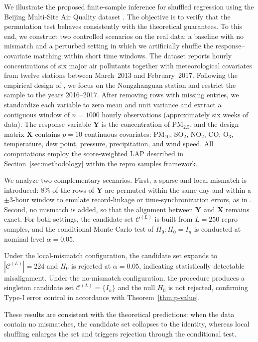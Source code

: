 \documentclass[11pt, reqno]{amsart}
\newcommand{\mC}{\mathcal{C}}
\newcommand{\1}{\mbox{1}\hspace{-0.25em}\mbox{l}}
\theoremstyle{definition}\newtheorem{problem}{Problem}[section]
\theoremstyle{definition}\newtheorem{definition}[problem]{Definition}
\theoremstyle{remark}\newtheorem{assumption}{Assumption}
\theoremstyle{remark}\newtheorem{remark}[problem]{Remark}
\theoremstyle{definition}\newtheorem{example}[problem]{Example}
\theoremstyle{plain}\newtheorem{theorem}[problem]{Theorem}
\theoremstyle{plain}\newtheorem{question}[problem]{Question}
\theoremstyle{plain}\newtheorem{lemma}[problem]{Lemma}
\theoremstyle{plain}\newtheorem{proposition}[problem]{Proposition}
\theoremstyle{plain}\newtheorem{corollary}[problem]{Corollary}
\theoremstyle{plain}\newtheorem{conjecture}[problem]{Conjecture}
\begin{document}
We illustrate the proposed finite-sample inference for shuffled regression using the Beijing Multi-Site Air Quality dataset \citep{beijing_multi-site_air_quality_501}. The objective is to verify that the permutation test behaves consistently with the theoretical guarantees. To this end, we construct two controlled scenarios on the real data: a baseline with no mismatch and a perturbed setting in which we artificially shuffle the response–covariate matching within short time windows. The dataset reports hourly concentrations of six major air pollutants together with meteorological covariates from twelve stations between March~2013 and February~2017.  
Following the empirical design of \cite{slawski2020two}, we focus on the Nongzhanguan station and restrict the sample to the years 2016–2017.  
After removing rows with missing entries, we standardize each variable to zero mean and unit variance and extract a contiguous window of $n=1000$ hourly observations (approximately six weeks of data).  
The response variable $\bm{Y}$ is the concentration of PM$_{2.5}$, and the design matrix $\bm X$ contains $p=10$ continuous covariates: PM$_{10}$, SO$_2$, NO$_2$, CO, O$_3$, temperature, dew point, pressure, precipitation, and wind speed.  
All computations employ the score-weighted LAP described in Section~\ref{sec:methodology} within the repro samples framework.

We analyze two complementary scenarios.  
First, a sparse and local mismatch is introduced: $8\%$ of the rows of $\bm Y$ are permuted within the same day and within a $\pm 3$-hour window to emulate record-linkage or time-synchronization errors, as in \cite{slawski2020two}.  
Second, no mismatch is added, so that the alignment between $\bm Y$ and $\bm X$ remains exact.  For both settings, the candidate set $\mC^{(L)}$ is built from $L=250$ repro samples, and the conditional Monte Carlo test of $H_0:\Pi_0=I_n$ is conducted at nominal level $\alpha = 0.05$. 

Under the local-mismatch configuration, the candidate set expands to $|\mC^{(L)}|=224$ and $H_0$ is rejected at $\alpha = 0.05$, indicating statistically detectable misalignment.  
Under the no-mismatch configuration, the procedure produces a singleton candidate set $\mC^{(L)}=\{I_n\}$ and the null $H_0$ is not rejected, confirming 
Type-I error control in accordance with Theorem~\ref{thm:p-value}.  

These results are consistent with the theoretical predictions: when the data contain no mismatches, the candidate set collapses to the identity, whereas local shuffling enlarges the set and triggers rejection through the conditional test.  
\end{document}
